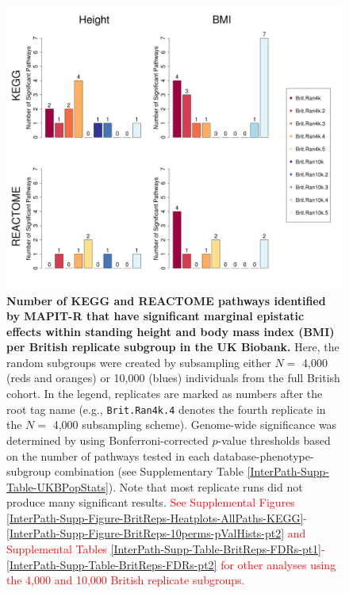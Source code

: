 \documentclass[10pt]{article}
\begin{document}
\begin{figure}[htbp]
\centering
\hspace*{-1.75cm}
\includegraphics[scale=.45]{Images/Supp/InterPath_Supp_Figure_BritReps_Barplot_vs4.png}
\caption{\textbf{Number of KEGG and REACTOME pathways identified by MAPIT-R that have significant marginal epistatic effects within standing height and body mass index (BMI) per British replicate subgroup in the UK Biobank.} Here, the random subgroups were created by subsampling either $N =$ 4,000 (reds and oranges) or 10,000 (blues) individuals from the full British cohort. In the legend, replicates are marked as numbers after the root tag name (e.g., \texttt{Brit.Ran4k.4} denotes the fourth replicate in the $N =$ 4,000 subsampling scheme). Genome-wide significance was determined by using Bonferroni-corrected $p$-value thresholds based on the number of pathways tested in each database-phenotype-subgroup combination (see Supplementary Table \ref{InterPath-Supp-Table-UKBPopStats}). Note that most replicate runs did not produce many significant results. \textcolor{red}{See Supplemental Figures \ref{InterPath-Supp-Figure-BritReps-Heatplots-AllPaths-KEGG}-\ref{InterPath-Supp-Figure-BritReps-10perms-pValHists-pt2} and Supplemental Tables \ref{InterPath-Supp-Table-BritReps-FDRs-pt1}-\ref{InterPath-Supp-Table-BritReps-FDRs-pt2} for other analyses using the 4,000 and 10,000 British replicate subgroups.}}
\label{InterPath-Supp-Figure-BritReps-Barplots}
\end{figure}
\clearpage
\end{document}
